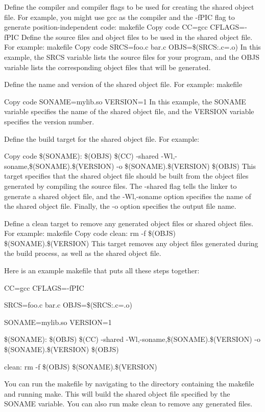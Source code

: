 \documentclass{article}
\begin{document}
  Define the compiler and compiler flags to be used for creating the
  shared object file. For example, you might use gcc as the compiler
  and the -fPIC flag to generate position-independent code: makefile
  Copy code CC=gcc CFLAGS=-fPIC Define the source files and object
  files to be used in the shared object file. For example: makefile
  Copy code SRCS=foo.c bar.c OBJS=\$(SRCS:.c=.o) In this example, the
  SRCS variable lists the source files for your program, and the OBJS
  variable lists the corresponding object files that will be generated.

  Define the name and version of the shared object file. For example:
  makefile

  Copy code SONAME=mylib.so VERSION=1 In this example, the SONAME
  variable specifies the name of the shared object file, and the
  VERSION variable specifies the version number.

  Define the build target for the shared object file. For example:

  Copy code \$(SONAME): \$(OBJS) \$(CC) -shared
  -Wl,-soname,\$(SONAME).\$(VERSION) -o \$(SONAME).\$(VERSION) \$(OBJS) This
  target specifies that the shared object file should be built from the
  object files generated by compiling the source files. The -shared
  flag tells the linker to generate a shared object file, and the
  -Wl,-soname option specifies the name of the shared object
  file. Finally, the -o option specifies the output file name.

  Define a clean target to remove any generated object files or shared
  object files. For example: makefile Copy code clean: rm -f \$(OBJS)
  \$(SONAME).\$(VERSION) This target removes any object files generated
  during the build process, as well as the shared object file.

  Here is an example makefile that puts all these steps together:

  CC=gcc CFLAGS=-fPIC

  SRCS=foo.c bar.c OBJS=\$(SRCS:.c=.o)

  SONAME=mylib.so VERSION=1

  \$(SONAME): \$(OBJS) \$(CC) -shared -Wl,-soname,\$(SONAME).\$(VERSION)
  -o \$(SONAME).\$(VERSION) \$(OBJS)

  clean: rm -f \$(OBJS) \$(SONAME).\$(VERSION)

  You can run the makefile by
  navigating to the directory containing the makefile and running
  make. This will build the shared object file specified by the SONAME
  variable. You can also run make clean to remove any generated files.
\end{document}

